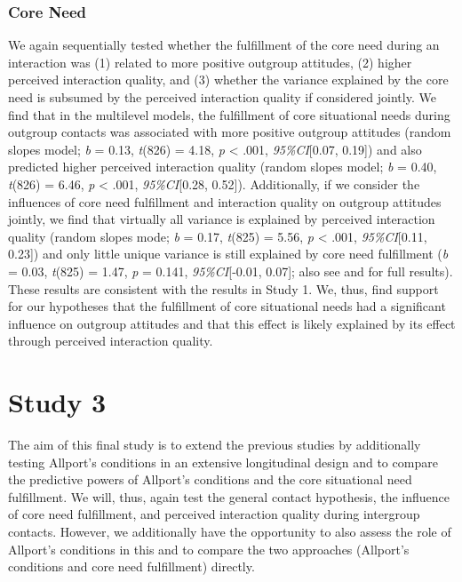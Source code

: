 \subsubsection{Core Need}

We again sequentially tested whether the fulfillment of the core need
during an interaction was (1) related to more positive outgroup
attitudes, (2) higher perceived interaction quality, and (3) whether the
variance explained by the core need is subsumed by the perceived
interaction quality if considered jointly. We find that in the
multilevel models, the fulfillment of core situational needs during
outgroup contacts was associated with more positive outgroup attitudes
(random slopes model; \textit{b} = 0.13, \textit{t}(826) = 4.18,
\textit{p} \textless{} .001, \textit{95\%CI}{[}0.07, 0.19{]}) and also
predicted higher perceived interaction quality (random slopes model;
\textit{b} = 0.40, \textit{t}(826) = 6.46, \textit{p} \textless{} .001,
\textit{95\%CI}{[}0.28, 0.52{]}). Additionally, if we consider the
influences of core need fulfillment and interaction quality on outgroup
attitudes jointly, we find that virtually all variance is explained by
perceived interaction quality (random slopes mode; \textit{b} = 0.17,
\textit{t}(825) = 5.56, \textit{p} \textless{} .001,
\textit{95\%CI}{[}0.11, 0.23{]}) and only little unique variance is
still explained by core need fulfillment (\textit{b} = 0.03,
\textit{t}(825) = 1.47, \textit{p} = 0.141, \textit{95\%CI}{[}-0.01,
0.07{]}; also see  and
 for full results). These results are
consistent with the results in Study 1. We, thus, find support for our
hypotheses that the fulfillment of core situational needs had a
significant influence on outgroup attitudes and that this effect is
likely explained by its effect through perceived interaction quality.

\section{Study 3}

The aim of this final study is to extend the previous studies by
additionally testing Allport's conditions in an extensive longitudinal
design and to compare the predictive powers of Allport's conditions and
the core situational need fulfillment. We will, thus, again test the
general contact hypothesis, the influence of core need fulfillment, and
perceived interaction quality during intergroup contacts. However, we
additionally have the opportunity to also assess the role of Allport's
conditions in this and to compare the two approaches (Allport's
conditions and core need fulfillment) directly.

